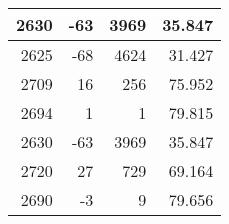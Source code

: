 \begin{longtable}{|r|r|r|r|}
		2630                                                                                               & -63                                                    & 3969                                                            & 35.847                                                                                                               \\ \hline
		2625                                                                                               & -68                                                    & 4624                                                            & 31.427                                                                                                               \\ \hline
		2709                                                                                               & 16                                                     & 256                                                             & 75.952                                                                                                               \\ \hline
		2694                                                                                               & 1                                                      & 1                                                               & 79.815                                                                                                               \\ \hline
		2630                                                                                               & -63                                                    & 3969                                                            & 35.847                                                                                                               \\ \hline
		2720                                                                                               & 27                                                     & 729                                                             & 69.164                                                                                                               \\ \hline
		2690                                                                                               & -3                                                     & 9                                                               & 79.656                                                                                                               \\ \hline

\end{longtable}
